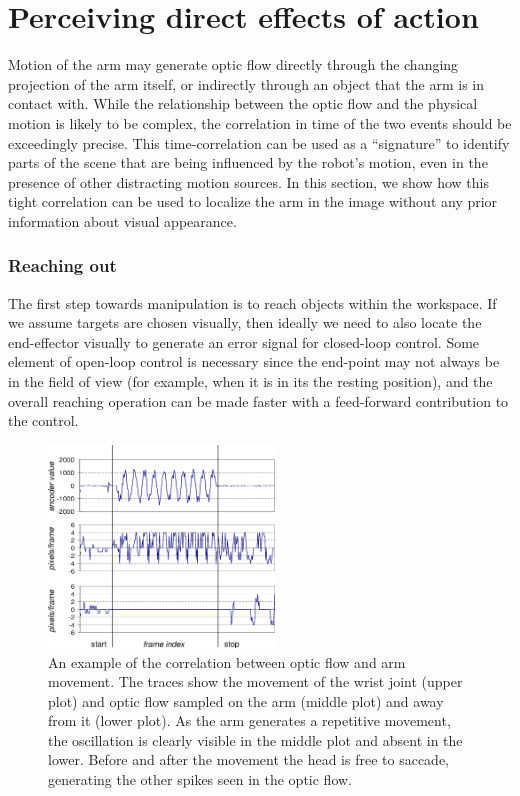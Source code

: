 
\section{Perceiving direct effects of action}

Motion of the arm may generate optic flow directly through the
changing projection of the arm itself, or indirectly through an object
that the arm is in contact with.  While the relationship between the
optic flow and the physical motion is likely to be complex,
the correlation in time of the two events should be
exceedingly precise.  This time-correlation can be used as a
``signature'' to identify parts of the scene that are being influenced
by the robot's motion, even in the presence of other distracting
motion sources.  In this section, we show how this tight correlation
can be used to localize the arm in the image without any prior
information about visual appearance.  

\subsubsection*{Reaching out}

The first step towards manipulation is to reach objects within the
workspace.  If we assume targets are chosen visually, then ideally we
need to also locate the end-effector visually to generate an error
signal for closed-loop control.  Some element of open-loop control is
necessary since the end-point may not always be in the field of view
(for example, when it is in its the resting position), and the overall
reaching operation can be made faster with a feed-forward contribution
to the control.

\begin{figure}[tb]
\begin{center}
\includegraphics[width=6.0cm]{joint-correlation3.eps}
\caption{ 
\label{fig:joint-correlation}
%
An example of the correlation between optic flow and arm movement.
The traces show the movement of the wrist joint (upper plot)
and optic flow sampled on the arm (middle plot) and away from it (lower
plot).  As the arm generates a repetitive movement, the oscillation
is clearly visible in the middle plot and absent in the lower.
Before and after the movement the head is free to saccade, generating the
other spikes seen in the optic flow.
%
}
\end{center}
\end{figure}


